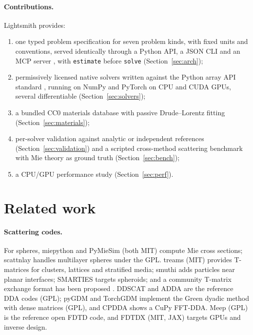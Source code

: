 \documentclass[11pt]{article}
\newcommand{\code}[1]{\texttt{#1}}
\newcommand{\LS}{Lightsmith}
\begin{document}
\paragraph{Contributions.} \LS{} provides:
\begin{enumerate}
  \item one typed problem specification for seven problem kinds, with fixed units and
  conventions, served identically through a Python API, a JSON CLI and an MCP server
  \cite{MCP2025spec}, with \code{estimate} before \code{solve} (Section~\ref{sec:arch});
  \item permissively licensed native solvers written against the Python array API standard
  \cite{ArrayAPI}, running on NumPy \cite{Harris2020numpy} and PyTorch \cite{Paszke2019pytorch}
  on CPU and CUDA GPUs, several differentiable (Section~\ref{sec:solvers});
  \item a bundled CC0 materials database with passive Drude--Lorentz fitting
  (Section~\ref{sec:materials});
  \item per-solver validation against analytic or independent references
  (Section~\ref{sec:validation}) and a scripted cross-method scattering benchmark with Mie theory
  as ground truth (Section~\ref{sec:bench});
  \item a CPU/GPU performance study (Section~\ref{sec:perf}).
\end{enumerate}

\section{Related work}
\label{sec:related}

\paragraph{Scattering codes.}
For spheres, miepython \cite{Prahl2023miepython} and PyMieSim \cite{PoinsinetdeSivry2023pymiesim}
(both MIT) compute Mie cross sections; scattnlay \cite{PenaPal2009} handles multilayer spheres under
the GPL. treams \cite{Beutel2024treams} (MIT) provides T-matrices for clusters, lattices and
stratified media; smuthi \cite{Egel2021smuthi} adds particles near planar interfaces; SMARTIES
\cite{Somerville2016smarties} targets spheroids; and a community T-matrix exchange format has been
proposed \cite{Asadova2025tmatrixformat}. DDSCAT \cite{Draine1994,DraineFlatau2013guide} and ADDA
\cite{Yurkin2011adda} are the reference DDA codes (GPL); pyGDM \cite{Wiecha2018pygdm} and TorchGDM
\cite{Ponomareva2025torchgdm} implement the Green dyadic method with dense matrices (GPL), and CPDDA
\cite{Xu2025cpdda} shows a CuPy FFT-DDA. Meep \cite{Oskooi2010meep} (GPL) is the reference open FDTD
code, and FDTDX \cite{Mahlau2026fdtdx} (MIT, JAX) targets GPUs and inverse design.
\end{document}
